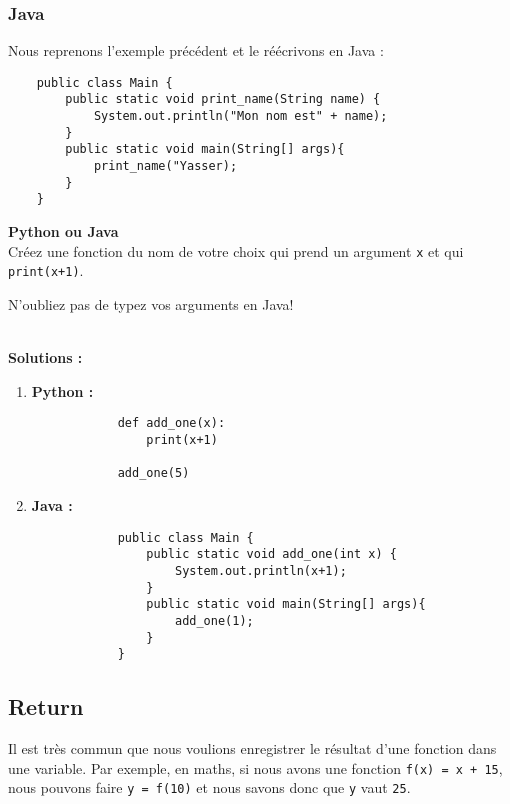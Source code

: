 \subsubsection{Java}

Nous reprenons l'exemple précédent et le réécrivons en Java :
\begin{verbatim}
    public class Main {
        public static void print_name(String name) {
            System.out.println("Mon nom est" + name); 
        }
        public static void main(String[] args){
            print_name("Yasser);
        }
    }
\end{verbatim}

\begin{Exercice}[5 minutes] \textbf{Python ou Java} \\
    Créez une fonction du nom de votre choix qui prend un argument \lstinline{x} et qui \lstinline{print(x+1)}.
        
    \begin{conseil}
        N'oubliez pas de typez vos arguments en Java!
    \end{conseil}
    \\
    \textbf{Solutions :}
    \begin{enumerate}
        \item \textbf{Python :}
        \begin{verbatim}
            def add_one(x):
                print(x+1)
                
            add_one(5)
        \end{verbatim}
        \item \textbf{Java :}
        \begin{verbatim}
            public class Main {
                public static void add_one(int x) {
                    System.out.println(x+1); 
                }
                public static void main(String[] args){
                    add_one(1);
                }
            }
        \end{verbatim}
    \end{enumerate}
        

\end{Exercice}

\subsection{Return}
Il est très commun que nous voulions enregistrer le résultat d'une fonction dans une variable. Par exemple, en maths, si nous avons une fonction \lstinline{f(x) = x + 15}, nous pouvons faire \lstinline{y = f(10)} et nous savons donc que \lstinline{y} vaut \lstinline{25}. 

